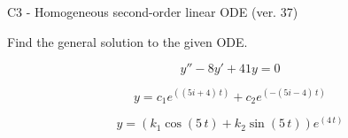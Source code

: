 \begin{exercise}
  \begin{exerciseTitle}C3 - Homogeneous second-order linear ODE (ver. 37)\end{exerciseTitle}
  \begin{exerciseStatement}
    
Find the general solution to the given ODE.

    
\[y''-8y'+41y = 0\]

  \end{exerciseStatement}
  \begin{exerciseAnswer}
    
\[y= c_{1} e^{\left(\left(5 i + 4\right) \, t\right)} + c_{2} e^{\left(-\left(5 i - 4\right) \, t\right)}\]

    
\[y= {\left(k_{1} \cos\left(5 \, t\right) + k_{2} \sin\left(5 \, t\right)\right)} e^{\left(4 \, t\right)}\]

  \end{exerciseAnswer}
\end{exercise}